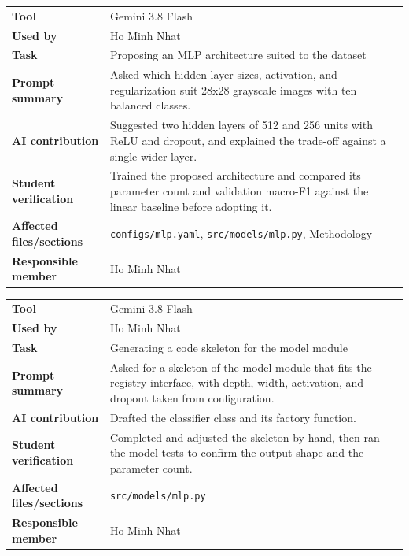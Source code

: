 \noindent\begin{minipage}{\textwidth}
\begin{tabularx}{\textwidth}{lX}
\hline
\textbf{Tool} & Gemini 3.8 Flash \\
\textbf{Used by} & Ho Minh Nhat \\
\textbf{Task} & Proposing an MLP architecture suited to the dataset \\
\textbf{Prompt summary} & Asked which hidden layer sizes, activation, and regularization suit 28x28 grayscale images with ten balanced classes. \\
\textbf{AI contribution} & Suggested two hidden layers of 512 and 256 units with ReLU and dropout, and explained the trade-off against a single wider layer. \\
\textbf{Student verification} & Trained the proposed architecture and compared its parameter count and validation macro-F1 against the linear baseline before adopting it. \\
\textbf{Affected files/sections} & \texttt{configs/mlp.yaml}, \texttt{src/models/mlp.py}, Methodology \\
\textbf{Responsible member} & Ho Minh Nhat \\
\hline
\end{tabularx}
\end{minipage}

\noindent\begin{minipage}{\textwidth}
\begin{tabularx}{\textwidth}{lX}
\hline
\textbf{Tool} & Gemini 3.8 Flash \\
\textbf{Used by} & Ho Minh Nhat \\
\textbf{Task} & Generating a code skeleton for the model module \\
\textbf{Prompt summary} & Asked for a skeleton of the model module that fits the registry interface, with depth, width, activation, and dropout taken from configuration. \\
\textbf{AI contribution} & Drafted the classifier class and its factory function. \\
\textbf{Student verification} & Completed and adjusted the skeleton by hand, then ran the model tests to confirm the output shape and the parameter count. \\
\textbf{Affected files/sections} & \texttt{src/models/mlp.py} \\
\textbf{Responsible member} & Ho Minh Nhat \\
\hline
\end{tabularx}
\end{minipage}

